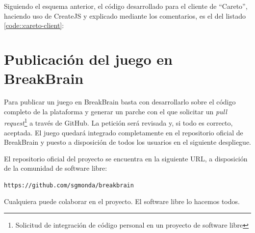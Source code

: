 Siguiendo el esquema anterior, el código desarrollado para el cliente de ``Careto'', haciendo uso de CreateJS y explicado mediante los comentarios, es el del listado \ref{code::careto-client}:

\vspace{0.5cm}



\section{Publicación del juego en BreakBrain}

Para publicar un juego en BreakBrain basta con desarrollarlo sobre el código completo de la plataforma y generar un parche con el que solicitar un {\it pull request}\footnote{Solicitud de integración de código personal en un proyecto de software libre} a través de GitHub. La petición será revisada y, si todo es correcto, aceptada. El juego quedará integrado completamente en el repositorio oficial de BreakBrain y puesto a disposición de todos los usuarios en el siguiente despliegue.

El repositorio oficial del proyecto se encuentra en la siguiente URL, a disposición de la comunidad de software libre:
\begin{center}
{\tt https://github.com/sgmonda/breakbrain}
\end{center}
Cualquiera puede colaborar en el proyecto. El software libre lo hacemos todos.
